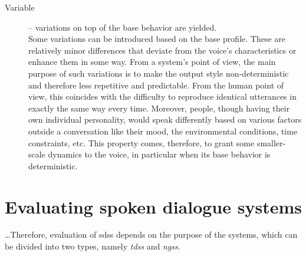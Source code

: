 \begin{description}
	\item[Variable] -- variations on top of the base behavior are yielded.\\
	Some variations can be introduced based on the base profile.
	These are relatively minor differences that deviate from the voice's characteristics or enhance them in some way.
	From a system's point of view, the main purpose of such variations is to make the output style non-deterministic and therefore less repetitive and predictable.
	From the human point of view, this coincides with the difficulty to reproduce identical utterances in exactly the same way every time.
	Moreover, people, though having their own individual personality, would speak differently based on various factors outside a conversation like their mood, the environmental conditions, time constraints, etc.
	This property comes, therefore, to grant some smaller-scale dynamics to the voice, in particular when its base behavior is deterministic.
\end{description}
%



\section{Evaluating spoken dialogue systems}
\label{sec:evaluation_of_sdss}


\ldots Therefore, evaluation of \acp{sds} depends on the purpose of the systems, which can be divided into two types, namely \textit{\aclp{tds}} and \textit{\aclp{ngs}}.

